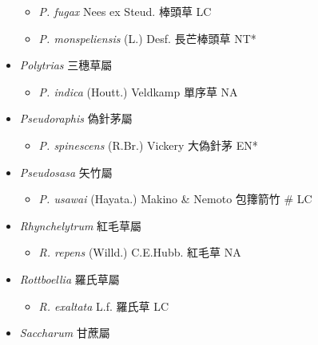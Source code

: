 \begin{itemize}
  \begin{itemize}
        \item[] \textit{P. fugax} Nees ex Steud.  棒頭草   LC
        \item[] \textit{P. monspeliensis} (L.) Desf.  長芒棒頭草   NT*
  \end{itemize}
 \item[] \textit{Polytrias} 三穗草屬
                                
  \begin{itemize}
        \item[] \textit{P. indica} (Houtt.) Veldkamp  單序草   NA
  \end{itemize}
 \item[] \textit{Pseudoraphis} 偽針茅屬
                                
  \begin{itemize}
        \item[] \textit{P. spinescens} (R.Br.) Vickery  大偽針茅   EN*
  \end{itemize}
 \item[] \textit{Pseudosasa} 矢竹屬
                                
  \begin{itemize}
        \item[] \textit{P. usawai} (Hayata.) Makino \& Nemoto  包籜箭竹  \# LC
  \end{itemize}
 \item[] \textit{Rhynchelytrum} 紅毛草屬
                                
  \begin{itemize}
        \item[] \textit{R. repens} (Willd.) C.E.Hubb.  紅毛草   NA
  \end{itemize}
 \item[] \textit{Rottboellia} 羅氏草屬
                                
  \begin{itemize}
        \item[] \textit{R. exaltata} L.f.  羅氏草   LC
  \end{itemize}
 \item[] \textit{Saccharum} 甘蔗屬
                                

\end{itemize}
